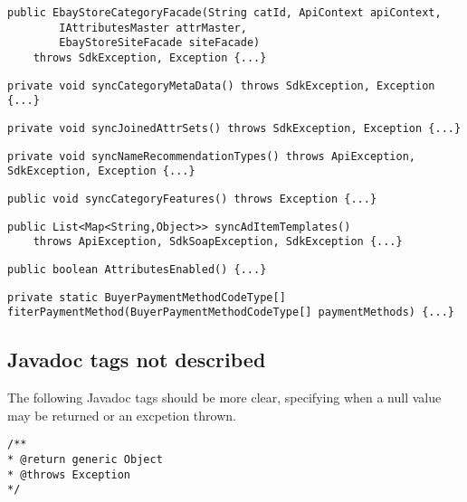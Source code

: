 \begin{lstlisting}[firstnumber=74, caption={Constructor description missing}]
public EbayStoreCategoryFacade(String catId, ApiContext apiContext,
        IAttributesMaster attrMaster,
        EbayStoreSiteFacade siteFacade)
    throws SdkException, Exception {...}
\end{lstlisting}

\begin{lstlisting}[firstnumber=82, caption={Method description missing}]
private void syncCategoryMetaData() throws SdkException, Exception {...}
\end{lstlisting}
\begin{lstlisting}[firstnumber=89, caption={Method description missing}]
private void syncJoinedAttrSets() throws SdkException, Exception {...}
\end{lstlisting}
\begin{lstlisting}[firstnumber=98, caption={Method description missing}]
private void syncNameRecommendationTypes() throws ApiException, SdkException, Exception {...}
\end{lstlisting}
\begin{lstlisting}[firstnumber=110, caption={Method description missing}]
public void syncCategoryFeatures() throws Exception {...}
\end{lstlisting}
\begin{lstlisting}[firstnumber=220, caption={Method description missing}]
public List<Map<String,Object>> syncAdItemTemplates()
	throws ApiException, SdkSoapException, SdkException {...}
\end{lstlisting}
\begin{lstlisting}[firstnumber=329, caption={Method description missing}]
public boolean AttributesEnabled() {...}
\end{lstlisting}

\begin{lstlisting}[firstnumber=161, caption={method Javadoc missing}]
private static BuyerPaymentMethodCodeType[] fiterPaymentMethod(BuyerPaymentMethodCodeType[] paymentMethods) {...}
\end{lstlisting}

\subsection{Javadoc tags not described}
The following Javadoc tags should be more clear, specifying when a null value may be returned or an excpetion thrown.

\begin{lstlisting}[firstnumber=177, caption={tags not described}]
/**
* @return generic Object
* @throws Exception
*/
\end{lstlisting}

